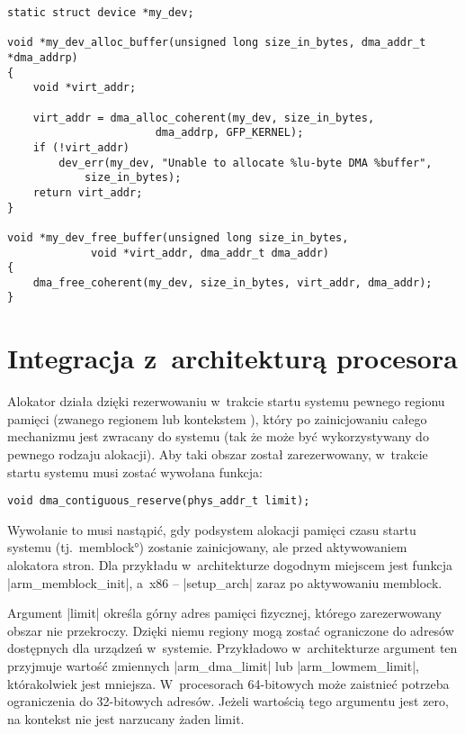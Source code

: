 \begin{lstlisting}[float=tbhp,caption={Alokacja bufora \acc{DMA} z~użyciem
      \acc{DMA} \acc{API}.},label=lst:dma-alloc-example]
static struct device *my_dev;

void *my_dev_alloc_buffer(unsigned long size_in_bytes, dma_addr_t *dma_addrp)
{
	void *virt_addr;

	virt_addr = dma_alloc_coherent(my_dev, size_in_bytes,
				       dma_addrp, GFP_KERNEL);
	if (!virt_addr)
		dev_err(my_dev, "Unable to allocate %lu-byte DMA %buffer",
			size_in_bytes);
	return virt_addr;
}

void *my_dev_free_buffer(unsigned long size_in_bytes,
			 void *virt_addr, dma_addr_t dma_addr)
{
	dma_free_coherent(my_dev, size_in_bytes, virt_addr, dma_addr);
}
\end{lstlisting}


\section{Integracja z~architekturą procesora}\label{sec:integrate-with-arch}

Alokator  działa dzięki rezerwowaniu w~trakcie startu systemu
pewnego regionu pamięci (zwanego regionem lub kontekstem ), który
po zainicjowaniu całego mechanizmu  jest zwracany do systemu (tak
że może być wykorzystywany do pewnego rodzaju alokacji).  Aby taki
obszar został zarezerwowany, w~trakcie startu systemu musi zostać
wywołana funkcja:

\begin{lstlisting}
void dma_contiguous_reserve(phys_addr_t limit);
\end{lstlisting}

Wywołanie to musi nastąpić, gdy podsystem alokacji pamięci czasu
startu systemu (tj.\ \ang*{memblock}) zostanie zainicjowany, ale przed
aktywowaniem alokatora stron.  Dla przykładu w~architekturze 
dogodnym miejscem jest funkcja \code|arm_memblock_init|, a~x86 --
\code|setup_arch| zaraz po aktywowaniu memblock.

Argument \code|limit| określa górny adres pamięci fizycznej, którego
zarezerwowany obszar  nie przekroczy.  Dzięki niemu regiony 
mogą zostać ograniczone do adresów dostępnych dla urządzeń w~systemie.
Przykładowo w~architekturze  argument ten przyjmuje wartość
zmiennych \code|arm_dma_limit| lub \code|arm_lowmem_limit|,
którakolwiek jest mniejsza.  W~procesorach 64-bitowych może zaistnieć
potrzeba ograniczenia do 32-bitowych adresów.  Jeżeli wartością tego
argumentu jest zero, na kontekst  nie jest narzucany żaden limit.

